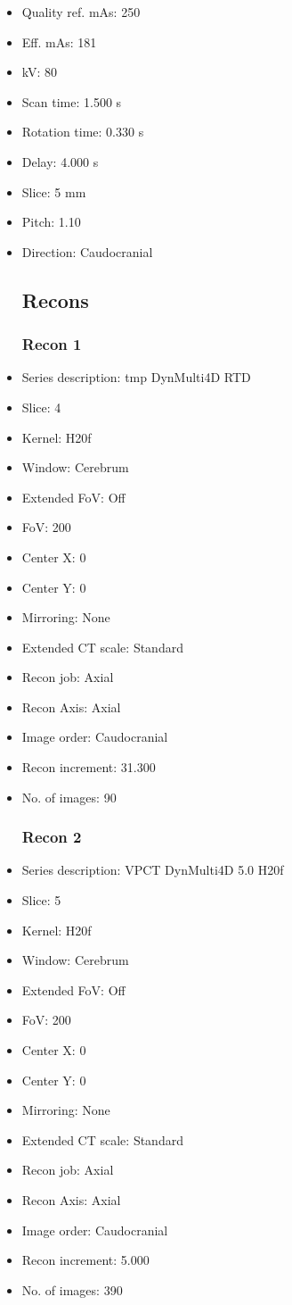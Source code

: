 \documentclass[12pt]{article}
\begin{document}
\begin{itemize}
\subsection{Scan}
\item Quality ref. mAs: 250\item Eff. mAs: 181\item kV: 80\item Scan time: 1.500 s\item Rotation time: 0.330 s\item Delay: 4.000 s\item Slice: 5 mm\item Pitch: 1.10\item Direction: Caudocranial\subsection{Recons}

\subsubsection{Recon 1}
\item Series description: tmp DynMulti4D RTD
\item Slice: 4
\item Kernel: H20f
\item Window: Cerebrum
\item Extended FoV: Off
\item FoV: 200
\item Center X: 0
\item Center Y: 0
\item Mirroring: None
\item Extended CT scale: Standard
\item Recon job: Axial
\item Recon Axis: Axial
\item Image order: Caudocranial
\item Recon increment: 31.300
\item No. of images: 90
\subsubsection{Recon 2}
\item Series description: VPCT DynMulti4D 5.0 H20f
\item Slice: 5
\item Kernel: H20f
\item Window: Cerebrum
\item Extended FoV: Off
\item FoV: 200
\item Center X: 0
\item Center Y: 0
\item Mirroring: None
\item Extended CT scale: Standard
\item Recon job: Axial
\item Recon Axis: Axial
\item Image order: Caudocranial
\item Recon increment: 5.000
\item No. of images: 390

\end{itemize}
\end{document}

